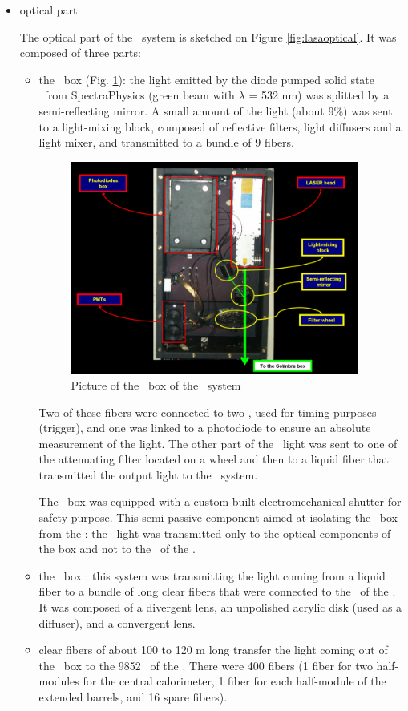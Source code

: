 \begin{itemize}
\item optical part 

	The optical part of the \lasi~system is sketched on Figure \ref{fig:lasaoptical}. It was composed of three parts:
	\begin{itemize}
	\item the \las~box (Fig. \ref{fig:lasabox}): the light emitted by the diode pumped solid state \las~from SpectraPhysics (green beam with $\lambda$ = 532 nm) was splitted by a semi-reflecting mirror. A small amount of the light (about 9\%) was sent to a light-mixing block, composed of reflective filters, light diffusers and a light mixer, and transmitted to a bundle of 9 fibers. \par
		\begin{figure}[htbp]
			\centering
			\includegraphics[height=7cm]{figures/LaserBox.png}
			\caption{Picture of the \las~box of the \lasi~system}\label{fig:lasabox}
		\end{figure}	
			
		Two of these fibers were connected to two \pmts, used for timing purposes (trigger), and one was linked to a photodiode to ensure an absolute measurement of the light. The other part of the \las~light was sent to one of the attenuating filter located on a wheel and then to a liquid fiber that transmitted the output light to the \coimbra~system. \par
                 The \las~box was equipped with a custom-built electromechanical shutter for safety purpose. This semi-passive component aimed at isolating the \las~box from the \tilecal: the \las~light was transmitted only to the optical components of the box and not to the \pmt~of the \tilecal. 

	\item the \coimbra~box : this system was transmitting the light coming from a liquid fiber to a bundle of long clear fibers that were connected to the \pmts~of the \tilecal. It was composed of a divergent lens, an unpolished acrylic disk (used as a diffuser), and a convergent lens.
	\item clear fibers of about 100 to 120 m long transfer the light coming out of the \coimbra~box to the 9852 \pmts~of the \tilecal. There were 400 fibers (1 fiber for two half-modules for the central calorimeter, 1 fiber for each half-module of the extended barrels, and 16 spare fibers). 
	\end{itemize}
		

\end{itemize}
